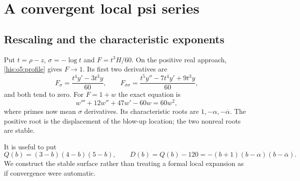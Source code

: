 \documentclass[11pt]{article}
\theoremstyle{remark}\newtheorem{remark}[theorem]{Remark}
\numberwithin{equation}{section}
\begin{document}
\section{A convergent local psi series}\label{his:o5:psisurface}
\subsection{Rescaling and the characteristic exponents}
Put $t=\rho-z$, $\sigma=-\log t$ and $F=t^3H/60$. On the positive real
approach, \eqref{his:o5:profile} gives $F\to1$. Its first two derivatives are
\[
F_\sigma=\frac{t^4y'-3t^3y}{60},\qquad
F_{\sigma\sigma}=\frac{t^5y''-7t^4y'+9t^3y}{60},
\]
and both tend to zero. For $F=1+w$ the exact equation is
\begin{equation}\label{his:o5:autonomous}
w'''+12w''+47w'-60w=60w^2,
\end{equation}
where primes now mean $\sigma$ derivatives. Its characteristic roots are
$1,-\alpha,-\overline\alpha$. The positive root is the displacement of
the blow-up location; the two nonreal roots are stable.

It is useful to put
\begin{equation}\label{his:o5:indicial}
Q(b)=(3-b)(4-b)(5-b),\qquad
D(b)=Q(b)-120=-(b+1)(b-\alpha)(b-\overline\alpha).
\end{equation}
We construct the stable surface rather than treating a formal local
expansion as if convergence were automatic.
\end{document}
